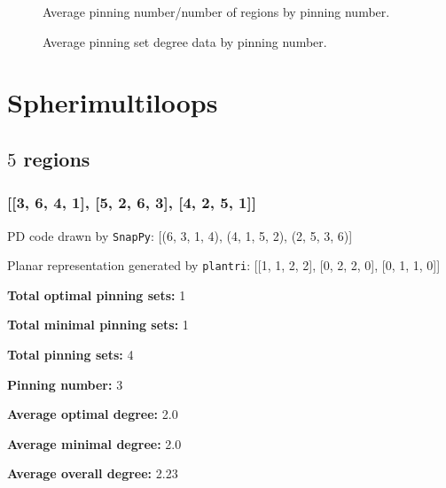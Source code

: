 \documentclass{article}%
\begin{document}
\begin{multicols}{2}
\begin{figure}[H]
\centering
\scalebox{0.6}{}
\caption{Average pinning number/number of regions by pinning number.}
\label{fig:tex/img/pinNumsAvgsPercentages.pgf}
\end{figure}
\columnbreak

\begin{figure}[H]
\centering
\scalebox{0.6}{}
\caption{Average pinning set degree data by pinning number.}
\label{fig:tex/img/pinNumsGonalities.pgf}
\end{figure}
\end{multicols}



\newpage

\section{Spherimultiloops}
\label{sec:multiloops}

\subsection{$5$ regions}

\subsubsection{[[3, 6, 4, 1], [5, 2, 6, 3], [4, 2, 5, 1]]}

{\small\noindent PD code drawn by \texttt{SnapPy}: [(6, 3, 1, 4), (4, 1, 5, 2), (2, 5, 3, 6)]}

{\small\noindent Planar representation generated by \texttt{plantri}: [[1, 1, 2, 2], [0, 2, 2, 0], [0, 1, 1, 0]]}

\begin{multicols}{2}
{\normalsize \noindent\textbf{Total optimal pinning sets:} 1

\noindent\textbf{Total minimal pinning sets:} 1

\noindent\textbf{Total pinning sets:} 4

\noindent\textbf{Pinning number:} 3

}
\columnbreak

{\normalsize \noindent\textbf{Average optimal degree:} 2.0

\noindent\textbf{Average minimal degree:} 2.0

\noindent\textbf{Average overall degree:} 2.23

}
\end{multicols}
\end{document}
